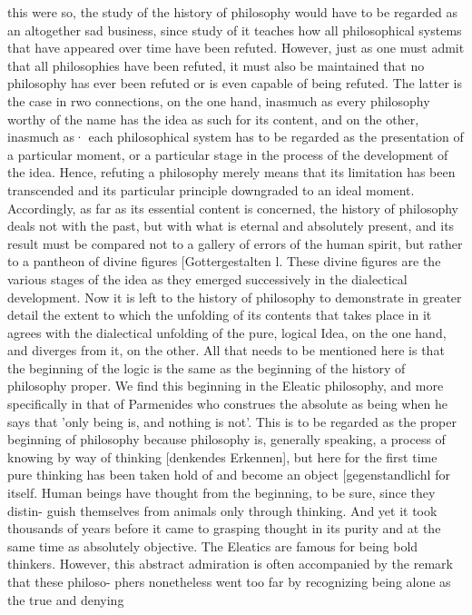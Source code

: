 this were so, the study of the history of philosophy would have to be regarded as an
altogether sad business, since study of it teaches how all philosophical systems that
have appeared over time have been refuted. However, just as one must admit that
all philosophies have been refuted, it must also be maintained that no philosophy
has ever been refuted or is even capable of being refuted. The latter is the case
in rwo connections, on the one hand, inasmuch as every philosophy worthy of
the name has the idea as such for its content, and on the other, inasmuch as·
each philosophical system has to be regarded as the presentation of a particular
moment, or a particular stage in the process of the development of the idea. Hence,
refuting a philosophy merely means that its limitation has been transcended and
its particular principle downgraded to an ideal moment. Accordingly, as far as its
essential content is concerned, the history of philosophy deals not with the past,
but with what is eternal and absolutely present, and its result must be compared
not to a gallery of errors of the human spirit, but rather to a pantheon of divine
figures [Gottergestalten l. These divine figures are the various stages of the idea as
they emerged successively in the dialectical development. Now it is left to the
history of philosophy to demonstrate in greater detail the extent to which the
unfolding of its contents that takes place in it agrees with the dialectical unfolding
of the pure, logical Idea, on the one hand, and diverges from it, on the other. All
that needs to be mentioned here is that the beginning of the logic is the same
as the beginning of the history of philosophy proper. We find this beginning in
the Eleatic philosophy, and more specifically in that of Parmenides who construes
the absolute as being when he says that 'only being is, and nothing is not'. This
is to be regarded as the proper beginning of philosophy because philosophy is,
generally speaking, a process of knowing by way of thinking [denkendes Erkennen],
but here for the first time pure thinking has been taken hold of and become an
object [gegenstandlichl for itself.
Human beings have thought from the beginning, to be sure, since they distin-
guish themselves from animals only through thinking. And yet it took thousands
of years before it came to grasping thought in its purity and at the same time as
absolutely objective. The Eleatics are famous for being bold thinkers. However,
this abstract admiration is often accompanied by the remark that these philoso-
phers nonetheless went too far by recognizing being alone as the true and denying
